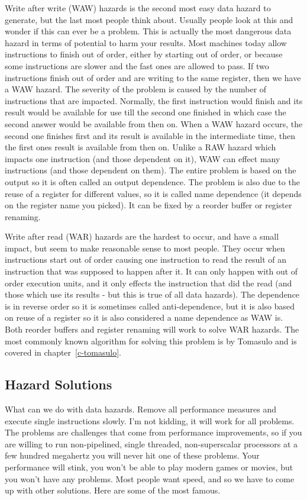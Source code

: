Write after write (WAW) hazards is the second most easy data hazard to generate, but the last most people think about.  Usually people look at this and wonder if this can ever be a problem.  This is actually the most dangerous data hazard in terms of potential to harm your results. Most machines today allow instructions to finish out of order, either by starting out of order, or because some instructions are slower and the fast ones are allowed to pass.  If two instructions finish out of order and are writing to the same register, then we have a WAW hazard.  The severity of the problem is caused by the number of instructions that are impacted.  Normally, the first instruction would finish and its result would be available for use till the second one finished in which case the second answer would be available from then on.  When a WAW hazard occurs, the second one finishes first and its result is available in the intermediate time, then the first ones result is available from then on.  Unlike a RAW hazard which impacts one instruction (and those dependent on it), WAW can effect many instructions (and those dependent on them).  The entire problem is based on the output so it is often called an output dependence.  The problem is also due to the reuse of a register for different values, so it is called name dependence (it depends on the register name you picked).   It can be fixed by a reorder buffer or register renaming.

Write after read (WAR) hazards are the hardest to occur, and have a small impact, but seem to make reasonable sense to most people.  They occur when instructions start out of order causing one instruction to read the result of an instruction that was supposed to happen after it.  It can only happen with out of order execution units, and it only effects the instruction that did the read (and those which use its results - but this is true of all data hazards).  The dependence is in reverse order so it is sometimes called anti-dependence, but it is also based on reuse of a register so it is also considered a name dependence as WAW is.  Both reorder buffers and register renaming will work to solve WAR hazards.  The most commonly known algorithm for solving this problem is by Tomasulo and is covered in chapter~\ref{c-tomasulo}.


\subsection{Hazard Solutions}\label{ss-haz_sol}
What can we do with data hazards.  Remove all performance measures and execute single instructions slowly.  I'm not kidding, it will work for all problems.  The problems are challenges that come from performance improvements, so if you are willing to run non-pipelined, single threaded, non-superscalar processors at a few hundred megahertz you will never hit one of these problems.  Your performance will stink, you won't be able to play modern games or movies, but you won't have any problems.  Most people want speed, and so we have to come up with other solutions.  Here are some of the most famous.

